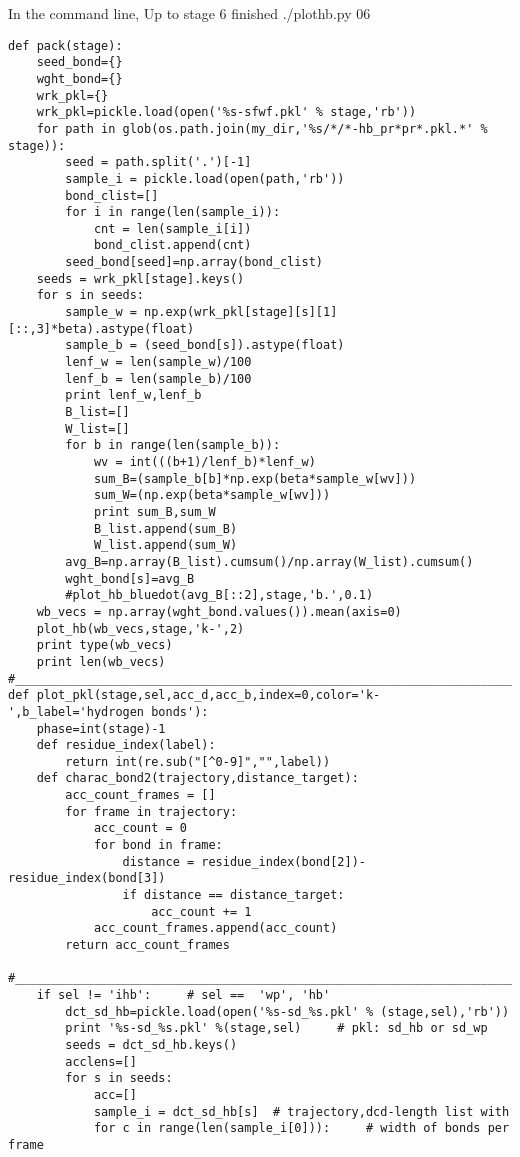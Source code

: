 \documentclass[11pt]{article}
\begin{document}
In the command line, Up to stage 6 finished
./plothb.py 06
\begin{verbatim}
def pack(stage):
    seed_bond={}
    wght_bond={}
    wrk_pkl={}
    wrk_pkl=pickle.load(open('%s-sfwf.pkl' % stage,'rb'))
    for path in glob(os.path.join(my_dir,'%s/*/*-hb_pr*pr*.pkl.*' % stage)):
        seed = path.split('.')[-1]
        sample_i = pickle.load(open(path,'rb'))
        bond_clist=[]
        for i in range(len(sample_i)):
            cnt = len(sample_i[i])
            bond_clist.append(cnt)
        seed_bond[seed]=np.array(bond_clist)
    seeds = wrk_pkl[stage].keys()
    for s in seeds:
        sample_w = np.exp(wrk_pkl[stage][s][1][::,3]*beta).astype(float)
        sample_b = (seed_bond[s]).astype(float)
        lenf_w = len(sample_w)/100
        lenf_b = len(sample_b)/100
        print lenf_w,lenf_b
        B_list=[]
        W_list=[]
        for b in range(len(sample_b)):
            wv = int(((b+1)/lenf_b)*lenf_w)
            sum_B=(sample_b[b]*np.exp(beta*sample_w[wv]))
            sum_W=(np.exp(beta*sample_w[wv]))
            print sum_B,sum_W
            B_list.append(sum_B)
            W_list.append(sum_W)
        avg_B=np.array(B_list).cumsum()/np.array(W_list).cumsum()
        wght_bond[s]=avg_B
        #plot_hb_bluedot(avg_B[::2],stage,'b.',0.1)
    wb_vecs = np.array(wght_bond.values()).mean(axis=0)
    plot_hb(wb_vecs,stage,'k-',2)
    print type(wb_vecs)
    print len(wb_vecs)
#____________________________________________________________________________
def plot_pkl(stage,sel,acc_d,acc_b,index=0,color='k-',b_label='hydrogen bonds'):
    phase=int(stage)-1
    def residue_index(label):
        return int(re.sub("[^0-9]","",label))
    def charac_bond2(trajectory,distance_target):
        acc_count_frames = []
        for frame in trajectory:
            acc_count = 0
            for bond in frame:
                distance = residue_index(bond[2])-residue_index(bond[3])
                if distance == distance_target:
                    acc_count += 1
            acc_count_frames.append(acc_count)
        return acc_count_frames
    #_________________________________________________________________________
    if sel != 'ihb':     # sel ==  'wp', 'hb'
        dct_sd_hb=pickle.load(open('%s-sd_%s.pkl' % (stage,sel),'rb'))
        print '%s-sd_%s.pkl' %(stage,sel)     # pkl: sd_hb or sd_wp
        seeds = dct_sd_hb.keys()
        acclens=[]
        for s in seeds:
            acc=[]
            sample_i = dct_sd_hb[s]  # trajectory,dcd-length list with
            for c in range(len(sample_i[0])):     # width of bonds per frame

\end{verbatim}
\end{document}
